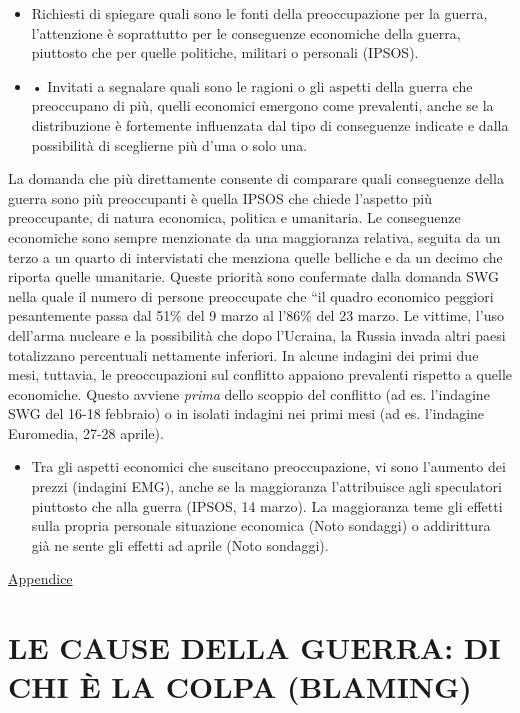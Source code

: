 \documentclass[
]{book}
\providecommand{\tightlist}{%
  \setlength{\itemsep}{0pt}\setlength{\parskip}{0pt}}
\begin{document}
\begin{itemize}
\item
  Richiesti di spiegare quali sono le fonti della preoccupazione per la guerra, l'attenzione è soprattutto per le conseguenze economiche della guerra, piuttosto che per quelle politiche, militari o personali (IPSOS).
\item
  • Invitati a segnalare quali sono le ragioni o gli aspetti della guerra che preoccupano di più, quelli economici emergono come prevalenti, anche se la distribuzione è fortemente influenzata dal tipo di conseguenze indicate e dalla possibilità di sceglierne più d'una o solo una.
\end{itemize}

La domanda che più direttamente consente di comparare quali conseguenze della guerra sono più preoccupanti è quella IPSOS che chiede l'aspetto più preoccupante, di natura economica, politica e umanitaria. Le conseguenze economiche sono sempre menzionate da una maggioranza relativa, seguita da un terzo a un quarto di intervistati che menziona quelle belliche e da un decimo che riporta quelle umanitarie. Queste priorità sono confermate dalla domanda SWG nella quale il numero di persone preoccupate che ``il quadro economico peggiori pesantemente passa dal 51\% del 9 marzo al l'86\% del 23 marzo. Le vittime, l'uso dell'arma nucleare e la possibilità che dopo l'Ucraina, la Russia invada altri paesi totalizzano percentuali nettamente inferiori. In alcune indagini dei primi due mesi, tuttavia, le preoccupazioni sul conflitto appaiono prevalenti rispetto a quelle economiche. Questo avviene \emph{prima} dello scoppio del conflitto (ad es. l'indagine SWG del 16-18 febbraio) o in isolati indagini nei primi mesi (ad es. l'indagine Euromedia, 27-28 aprile).

\begin{itemize}
\tightlist
\item
  Tra gli aspetti economici che suscitano preoccupazione, vi sono l'aumento dei prezzi (indagini EMG), anche se la maggioranza l'attribuisce agli speculatori piuttosto che alla guerra (IPSOS, 14 marzo). La maggioranza teme gli effetti sulla propria personale situazione economica (Noto sondaggi) o addirittura già ne sente gli effetti ad aprile (Noto sondaggi).
\end{itemize}

\href{https://github.com/LucianaFazio/Ucrania/blob/main/PDF_Appendice/II\%20Preoccupazioni\%20Ucraina\%20v.6.pdf}{Appendice}

\hypertarget{le-cause-della-guerra-di-chi-uxe8-la-colpa-blaming}{%
\chapter{LE CAUSE DELLA GUERRA: DI CHI È LA COLPA (BLAMING)}\label{le-cause-della-guerra-di-chi-uxe8-la-colpa-blaming}}
\end{document}
